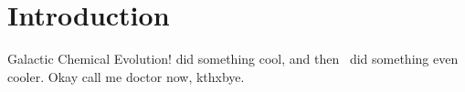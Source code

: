 \documentclass[main.tex]{subfiles}
\begin{document}
\chapter{Introduction}

Galactic Chemical Evolution!
\citet{Johnson2020} did something cool, and then~\citet{Johnson2021} did
something even cooler.
Okay call me doctor now, kthxbye.
\end{document}
